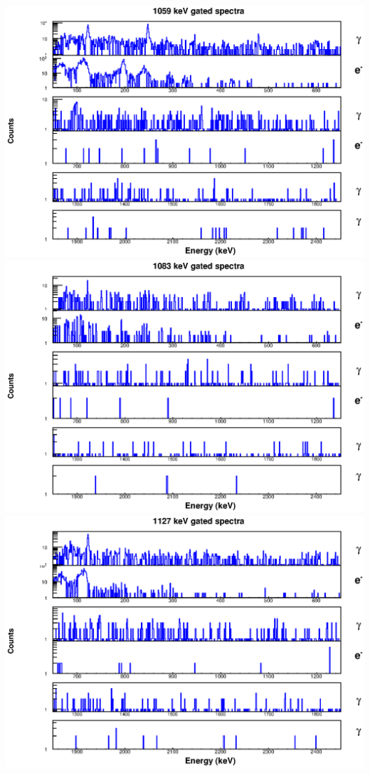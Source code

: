 \includegraphics[scale=0.8]{154Gd_Appendix/1059_combined.eps}
\includegraphics[scale=0.8]{154Gd_Appendix/1083_combined.eps}
\includegraphics[scale=0.8]{154Gd_Appendix/1127_combined.eps}
